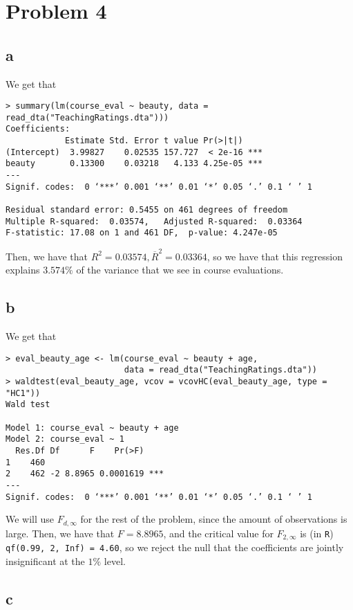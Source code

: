 \documentclass[12pt,letterpaper]{article}
\theoremstyle{definition}
\begin{document}
\section*{Problem 4}
\subsection*{a}

We get that
\begin{Verbatim}[fontsize=\small]
> summary(lm(course_eval ~ beauty, data = read_dta("TeachingRatings.dta")))
Coefficients:
            Estimate Std. Error t value Pr(>|t|)
(Intercept)  3.99827    0.02535 157.727  < 2e-16 ***
beauty       0.13300    0.03218   4.133 4.25e-05 ***
---
Signif. codes:  0 ‘***’ 0.001 ‘**’ 0.01 ‘*’ 0.05 ‘.’ 0.1 ‘ ’ 1

Residual standard error: 0.5455 on 461 degrees of freedom
Multiple R-squared:  0.03574,	Adjusted R-squared:  0.03364
F-statistic: 17.08 on 1 and 461 DF,  p-value: 4.247e-05
\end{Verbatim}
Then, we have that $R^{2} = 0.03574, \overline{R}^{2} = 0.03364$, so we have that this regression explains $3.574\%$ of the variance that we see in course evaluations.

\subsection*{b}

We get that
\begin{Verbatim}[fontsize=\small]
> eval_beauty_age <- lm(course_eval ~ beauty + age,
                        data = read_dta("TeachingRatings.dta"))
> waldtest(eval_beauty_age, vcov = vcovHC(eval_beauty_age, type = "HC1"))
Wald test

Model 1: course_eval ~ beauty + age
Model 2: course_eval ~ 1
  Res.Df Df      F    Pr(>F)
1    460
2    462 -2 8.8965 0.0001619 ***
---
Signif. codes:  0 ‘***’ 0.001 ‘**’ 0.01 ‘*’ 0.05 ‘.’ 0.1 ‘ ’ 1
\end{Verbatim}
We will use $F_{d, \infty}$ for the rest of the problem, since the amount of observations is large. Then, we have that $F = 8.8965$, and the critical value for $F_{2,\infty}$ is (in \verb|R|) \verb|qf(0.99, 2, Inf) = 4.60|, so we reject the null that the coefficients are jointly insignificant at the $1\%$ level.

\subsection*{c}
\end{document}
